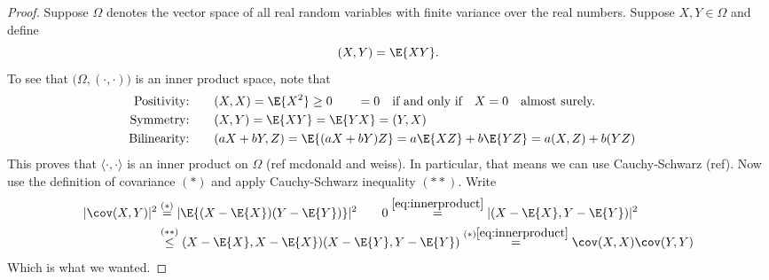 \documentclass[11pt,english,a4paper]{article}
\begin{document}
\begin{proof}
Suppose $\Omega$ denotes the vector space of all real random variables with finite variance over the real numbers. Suppose $X,Y \in \Omega$ and define
\begin{equation}
(X,Y) = \E{X Y}. \label{eq:innerproduct}
\end{equation}
To see that $\big( \Omega, (\cdot,\cdot) \big)$ is an inner product space, note that
\begin{align*}
\text{Positivity:} \qquad &(X,X) = \E{X^2} \geq 0 \qquad =0 \quad \text{if and only if} \quad X=0 \quad \text{almost surely.}\\ 
\text{Symmetry:} \qquad &(X,Y) = \E{XY} = \E{YX} = (Y,X)\\ 
\text{Bilinearity:} \qquad &(aX + bY,Z) = \E{(aX + bY)Z} = a\E{XZ} + b\E{YZ} = a(X,Z) + b(YZ) &
\end{align*}
This proves that $\langle \cdot, \cdot \rangle$ is an inner product on $\Omega$ (ref mcdonald and weiss). In particular, that means we can use Cauchy-Schwarz (ref). Now use the definition of covariance $(*)$ and apply Cauchy-Schwarz inequality $(**)$. Write
\begin{align*}
| \cov (X,Y) |^2 &\stackrel{(*)}{=} | \E{(X - \E{X})(Y - \E{Y})} |^2\qquad 0  \stackrel{\eqref{eq:innerproduct}}{=} | (X-\E{X}, Y-\E{Y}) |^2 \\
&\stackrel{(**)}{\leq}  (X-\E{X}, X-\E{X})(X-\E{Y}, Y-\E{Y}) \stackrel{(*)\eqref{eq:innerproduct}}{=} \cov (X,X) \cov (Y,Y)
\end{align*}
Which is what we wanted.
\end{proof}
\printbibliography
\end{document}
